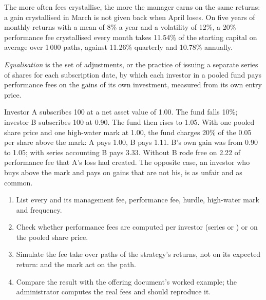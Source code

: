 The more often fees crystallise, the more the manager earns on the same returns: a gain crystallised in March is not given back when April loses.
On five years of monthly returns with a mean of 8\% a year and a volatility of 12\%, a 20\% performance fee crystallised every month takes 11.54\%
of the starting capital on average over 1\,000 paths, against 11.26\% quarterly and 10.78\% annually.

\begin{definition}[Equalisation]\label{def:fm:the-asset-manager-and-the-fund:eq}
\emph{Equalisation} is the set of adjustments, or the practice of issuing a separate series of shares for each subscription
date, by which each investor in a pooled fund pays performance fees on the gains of its own investment, measured from its own entry price.
\end{definition}

\begin{example}\label{ex:fm:the-asset-manager-and-the-fund:free}
Investor A subscribes 100 at a net asset value of 1.00. The fund falls 10\%; investor B subscribes 100 at 0.90. The fund then rises to 1.05. With
one pooled share price and one high-water mark at 1.00, the fund charges 20\% of the 0.05 per share above the mark: A pays 1.00, B pays 1.11. B's
own gain was from 0.90 to 1.05; with series accounting B pays 3.33. Without  B rode free on 2.22 of performance fee that A's loss had
created. The opposite case, an investor who buys above the mark and pays on gains that are not his, is as unfair and as common.
\end{example}

\begin{method}\label{met:fm:the-asset-manager-and-the-fund:fees}
\begin{enumerate}
\item List every  and its management fee, performance fee, hurdle, high-water mark and  frequency.
\item Check whether performance fees are computed per investor (series or ) or on the pooled share price.
\item Simulate the fee take over paths of the strategy's returns, not on its expected return:  and the mark act on the path.
\item Compare the result with the offering document's worked example; the administrator computes the real fees and should reproduce it.
\end{enumerate}
\end{method}

